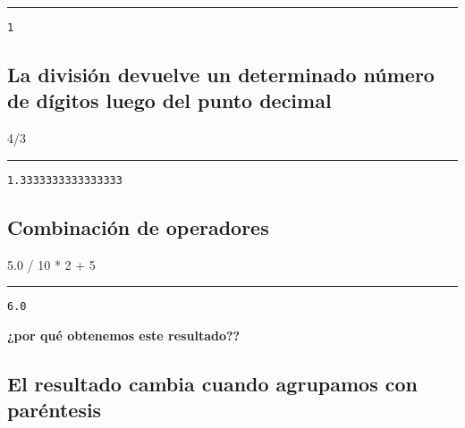 \documentclass[]{article}
\newenvironment{Shaded}{}{}
\newcommand{\DecValTok}[1]{\textcolor[rgb]{0.25,0.63,0.44}{#1}}
\newcommand{\FloatTok}[1]{\textcolor[rgb]{0.25,0.63,0.44}{#1}}
\newcommand{\OperatorTok}[1]{\textcolor[rgb]{0.40,0.40,0.40}{#1}}
\begin{document}
\begin{center}\rule{0.5\linewidth}{\linethickness}\end{center}

\begin{verbatim}
1
\end{verbatim}

\subsection{La división devuelve un determinado número de dígitos luego
del punto
decimal}\label{la-divisiuxf3n-devuelve-un-determinado-nuxfamero-de-duxedgitos-luego-del-punto-decimal}

\begin{Shaded}
\begin{Highlighting}[]
\DecValTok{4}\OperatorTok{/}\DecValTok{3}
\end{Highlighting}
\end{Shaded}

\begin{center}\rule{0.5\linewidth}{\linethickness}\end{center}

\begin{verbatim}
1.3333333333333333
\end{verbatim}

\subsection{Combinación de
operadores}\label{combinaciuxf3n-de-operadores}

\begin{Shaded}
\begin{Highlighting}[]
\FloatTok{5.0} \OperatorTok{/} \DecValTok{10} \OperatorTok{*} \DecValTok{2} \OperatorTok{+} \DecValTok{5}
\end{Highlighting}
\end{Shaded}

\begin{center}\rule{0.5\linewidth}{\linethickness}\end{center}

\begin{verbatim}
6.0
\end{verbatim}

\textbf{¿por qué obtenemos este resultado??}

\subsection{El resultado cambia cuando agrupamos con
paréntesis}\label{el-resultado-cambia-cuando-agrupamos-con-paruxe9ntesis}
\end{document}
